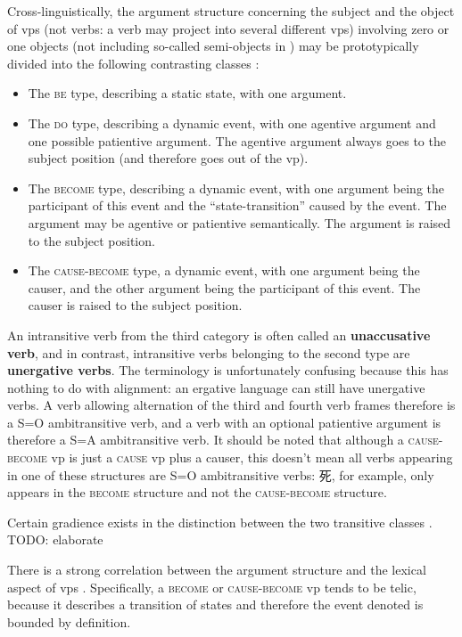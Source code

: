 \documentclass[UTF8, a4paper, oneside, scheme=plain]{ctexrep}
\newcommand*{\citechap}[1]{chap.~{#1}}
\newcommand*{\concept}[1]{\textbf{#1}}
\newcommand*{\category}[1]{\textsc{#1}}
\begin{document}
Cross-linguistically, 
the argument structure concerning the subject and the object of \acs{vp}s 
(not verbs: a verb may project into several different \acs{vp}s) 
involving zero or one objects 
(not including so-called semi-objects in )
may be prototypically divided into the following contrasting classes 
\citep[\citechap{6}]{deng2010formal}:
\begin{itemize}
    \item The \category{be} type, describing a static state, with one argument.
    \item The \category{do} type, describing a dynamic event, with one agentive argument 
        and one possible patientive argument.
        The agentive argument always goes to the subject position 
        (and therefore goes out of the \acs{vp}).
    \item The \category{become} type, describing a dynamic event, 
        with one argument being the participant of this event 
        and the ``state-transition'' caused by the event. 
        The argument may be agentive or patientive semantically.
        The argument is raised to the subject position.
    \item The \category{cause-become} type, a dynamic event, 
        with one argument being the causer, 
        and the other argument being the participant of this event.
        The causer is raised to the subject position.
\end{itemize}
An intransitive verb from the third category
is often called an \concept{unaccusative verb}, 
and in contrast, 
intransitive verbs belonging to the second type 
are \concept{unergative verbs}.
The terminology is unfortunately confusing
because this has nothing to do with alignment:
an ergative language can still have unergative verbs.
A verb allowing alternation of the third and fourth verb frames therefore 
is a S=O ambitransitive verb,
and a verb with an optional patientive argument 
is therefore a S=A ambitransitive verb.
It should be noted that although a \category{cause-become} \acs{vp}
is just a \category{cause} \acs{vp} plus a causer, 
this doesn't mean all verbs appearing in one of these structures 
are S=O ambitransitive verbs:
死, for example, only appears in the \category{become} structure 
and not the \category{cause}-\category{become} structure.

Certain gradience exists in the distinction between the two transitive classes
\citep{lin2021unaccusativity}. TODO: elaborate

There is a strong correlation between the argument structure 
and the lexical aspect of \acs{vp}s
\citep{laws2010core,toratani1997typology,aljovic2000unaccusativity}.
Specifically, a \category{become} or \category{cause}-\category{become} \acs{vp}
tends to be telic, 
because it describes a transition of states 
and therefore the event denoted is bounded by definition.
\end{document}
